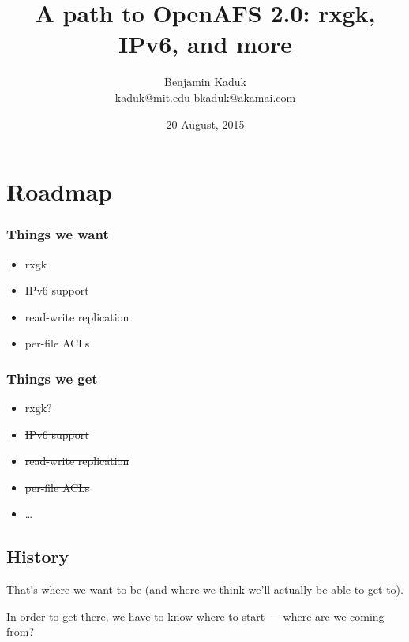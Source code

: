 \documentclass{beamer}
\title{A path to OpenAFS 2.0: rxgk, IPv6, and more}
\author{Benjamin Kaduk \\ \url{kaduk@mit.edu} \url{bkaduk@akamai.com}}
\date{20 August, 2015}
\begin{document}
\AtBeginSection[]
{
    \begin{frame}
	\tableofcontents[currentsection]
    \end{frame}
}

\frame{\titlepage}

\section{Roadmap}

\begin{frame}
\frametitle{Things we want}
\begin{itemize}
\item{rxgk\hphantom{?}}
\item{IPv6 support}
\item{read-write replication}
\item{per-file ACLs}
\vphantom{\item{\ldots}}
\end{itemize}
\end{frame}

\begin{frame}
\frametitle{Things we get}
\begin{itemize}
\item{rxgk?}
\pause
\item{\sout{IPv6 support}}
\pause
\item{\sout{read-write replication}}
\pause
\item{\sout{per-file ACLs}}
\pause
\item{\ldots}
\end{itemize}
\end{frame}

\subsection{History}

\begin{frame}
That's where we want to be (and where we think we'll actually be able to
get to).

\vspace{1em}
In order to get there, we have to know where to start --- where are we
coming from?
\end{frame}
\end{document}
